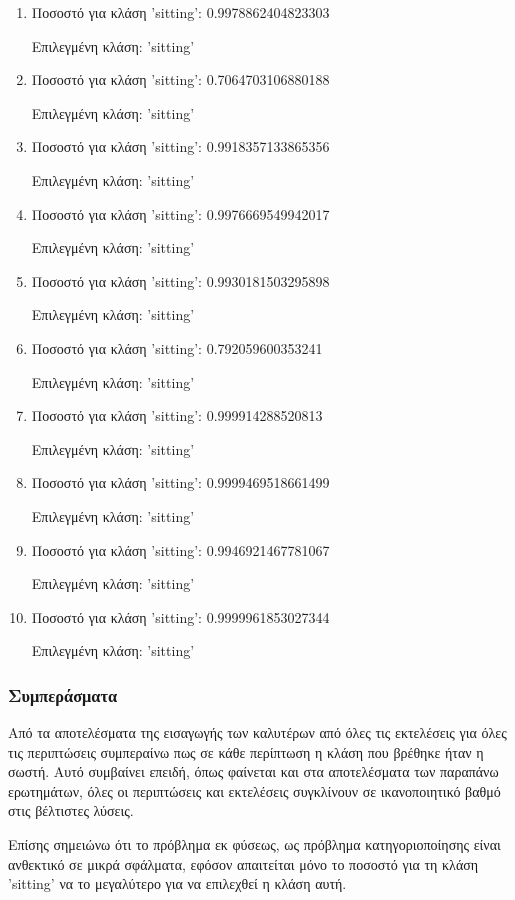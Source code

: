 \documentclass[12pt,a4paper]{article}
\begin{document}
\begin{enumerate}
    \item Ποσοστό για κλάση 'sitting': 0.9978862404823303

          Επιλεγμένη κλάση: 'sitting'
    \item Ποσοστό για κλάση 'sitting': 0.7064703106880188

          Επιλεγμένη κλάση: 'sitting'
    \item Ποσοστό για κλάση 'sitting': 0.9918357133865356

          Επιλεγμένη κλάση: 'sitting'
    \item Ποσοστό για κλάση 'sitting': 0.9976669549942017

          Επιλεγμένη κλάση: 'sitting'
    \item Ποσοστό για κλάση 'sitting': 0.9930181503295898

          Επιλεγμένη κλάση: 'sitting'
    \item Ποσοστό για κλάση 'sitting': 0.792059600353241

          Επιλεγμένη κλάση: 'sitting'
    \item Ποσοστό για κλάση 'sitting': 0.999914288520813

          Επιλεγμένη κλάση: 'sitting'
    \item Ποσοστό για κλάση 'sitting': 0.9999469518661499

          Επιλεγμένη κλάση: 'sitting'
    \item Ποσοστό για κλάση 'sitting': 0.9946921467781067

          Επιλεγμένη κλάση: 'sitting'
    \item Ποσοστό για κλάση 'sitting': 0.9999961853027344

          Επιλεγμένη κλάση: 'sitting'
\end{enumerate}

\subsubsection{Συμπεράσματα}

Από τα αποτελέσματα της εισαγωγής των καλυτέρων από όλες τις εκτελέσεις για όλες τις περιπτώσεις συμπεραίνω πως σε κάθε περίπτωση η κλάση που βρέθηκε ήταν η σωστή. Αυτό συμβαίνει επειδή, όπως φαίνεται και στα αποτελέσματα των παραπάνω ερωτημάτων, όλες οι περιπτώσεις και εκτελέσεις συγκλίνουν σε ικανοποιητικό βαθμό στις βέλτιστες λύσεις.

Επίσης σημειώνω ότι το πρόβλημα εκ φύσεως, ως πρόβλημα κατηγοριοποίησης είναι ανθεκτικό σε μικρά σφάλματα, εφόσον απαιτείται μόνο το ποσοστό για τη κλάση 'sitting' να το μεγαλύτερο για να επιλεχθεί η κλάση αυτή.
\end{document}
